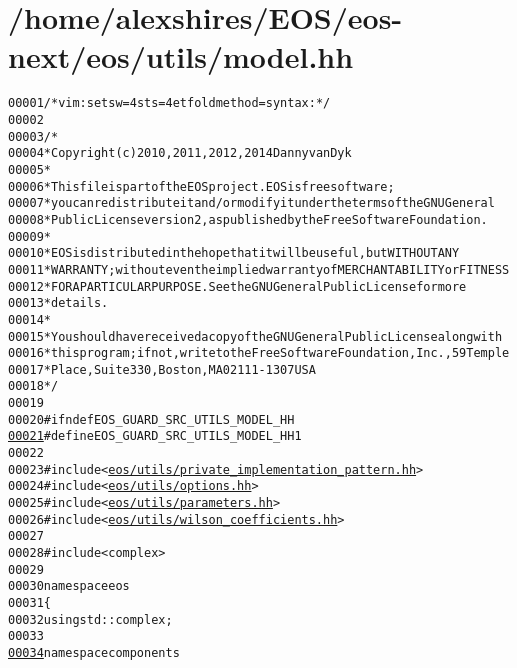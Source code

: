 \hypertarget{model_8hh_source}{
\section{/home/alexshires/EOS/eos-\/next/eos/utils/model.hh}
}


\begin{footnotesize}\begin{alltt}
00001 \textcolor{comment}{/* vim: set sw=4 sts=4 et foldmethod=syntax : */}
00002 
00003 \textcolor{comment}{/*}
00004 \textcolor{comment}{ * Copyright (c) 2010, 2011, 2012, 2014 Danny van Dyk}
00005 \textcolor{comment}{ *}
00006 \textcolor{comment}{ * This file is part of the EOS project. EOS is free software;}
00007 \textcolor{comment}{ * you can redistribute it and/or modify it under the terms of the GNU General}
00008 \textcolor{comment}{ * Public License version 2, as published by the Free Software Foundation.}
00009 \textcolor{comment}{ *}
00010 \textcolor{comment}{ * EOS is distributed in the hope that it will be useful, but WITHOUT ANY}
00011 \textcolor{comment}{ * WARRANTY; without even the implied warranty of MERCHANTABILITY or FITNESS}
00012 \textcolor{comment}{ * FOR A PARTICULAR PURPOSE.  See the GNU General Public License for more}
00013 \textcolor{comment}{ * details.}
00014 \textcolor{comment}{ *}
00015 \textcolor{comment}{ * You should have received a copy of the GNU General Public License along with}
00016 \textcolor{comment}{ * this program; if not, write to the Free Software Foundation, Inc., 59 Temple}
00017 \textcolor{comment}{ * Place, Suite 330, Boston, MA  02111-1307  USA}
00018 \textcolor{comment}{ */}
00019 
00020 \textcolor{preprocessor}{#ifndef EOS\_GUARD\_SRC\_UTILS\_MODEL\_HH}
\hypertarget{model_8hh_source_l00021}{}\hyperlink{model_8hh_a840a218887d25b75651ba408ae261e9d}{00021} \textcolor{preprocessor}{}\textcolor{preprocessor}{#define EOS\_GUARD\_SRC\_UTILS\_MODEL\_HH 1}
00022 \textcolor{preprocessor}{}
00023 \textcolor{preprocessor}{#include <\hyperlink{private__implementation__pattern_8hh}{eos/utils/private_implementation_pattern.hh}>}
00024 \textcolor{preprocessor}{#include <\hyperlink{options_8hh}{eos/utils/options.hh}>}
00025 \textcolor{preprocessor}{#include <\hyperlink{parameters_8hh}{eos/utils/parameters.hh}>}
00026 \textcolor{preprocessor}{#include <\hyperlink{wilson__coefficients_8hh}{eos/utils/wilson_coefficients.hh}>}
00027 
00028 \textcolor{preprocessor}{#include <complex>}
00029 
00030 \textcolor{keyword}{namespace }eos
00031 \{
00032     \textcolor{keyword}{using} std::complex;
00033 
\hypertarget{model_8hh_source_l00034}{}\hyperlink{namespaceeos_1_1components}{00034}     \textcolor{keyword}{namespace }components

\end{alltt}
\end{footnotesize}
